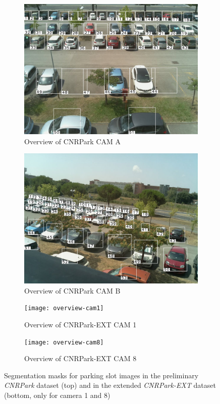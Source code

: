 \begin{figure}
\centering
\begin{subfigure}[b]{0.49\columnwidth}
	\includegraphics[width=\columnwidth]{camera-a-overview}
	\caption{Overview of CNRPark CAM A}
	\label{fig:mini:cam-a}
\end{subfigure} %
\begin{subfigure}[b]{0.49\columnwidth}
	\includegraphics[width=\columnwidth]{camera-b-overview}
	\caption{Overview of CNRPark CAM B}
	\label{fig:mini:cam-b}
\end{subfigure}

\begin{subfigure}[b]{0.49\columnwidth}
	\texttt{[image: overview-cam1]}
	\caption{Overview of CNRPark-EXT CAM 1}
	\label{fig:mini:cam-1}
\end{subfigure} %
\begin{subfigure}[b]{0.49\columnwidth}
	\texttt{[image: overview-cam8]}
	\caption{Overview of CNRPark-EXT CAM 8}
	\label{fig:mini:cam-8}
\end{subfigure}
\caption{Segmentation masks for parking slot images in the preliminary \emph{CNRPark} dataset (top) and in the extended \emph{CNRPark-EXT} dataset (bottom, only for camera 1 and 8)}
\label{fig:mini:cam-overview}
\end{figure}

